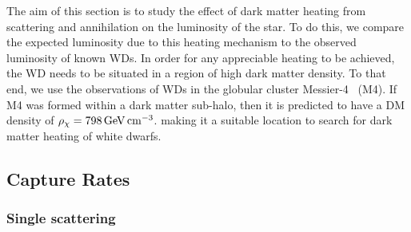 The aim of this section is to study the effect of dark matter heating from scattering and annihilation on the luminosity of the star. To do this, we compare the expected luminosity due to this heating mechanism to the observed luminosity of known WDs. In order for any appreciable heating to be achieved, the WD needs to be situated in a region of high dark matter density. To that end, we use the observations of WDs in the globular cluster Messier-4~\cite{Neeley_jul_Distanceglobularcluster, Watkins_apr_Tychogaiaastrometricsolution, Shao_nov_GaiaparallaxMilky, McCullough:2010ai_CaptureInelasticDark} (M4). If M4 was formed within a dark matter sub-halo, then it is predicted to have a DM density of $\rho_\chi = 798 {\rm \,GeV}{\rm \,cm}^{-3}$. making it a suitable location to search for dark matter heating of white dwarfs.

\subsection{Capture Rates}
\label{ch4:subsec:capture_rates_WD}



\subsubsection{Single scattering}
\label{ch4:subsubsec:single_scatter_e}

